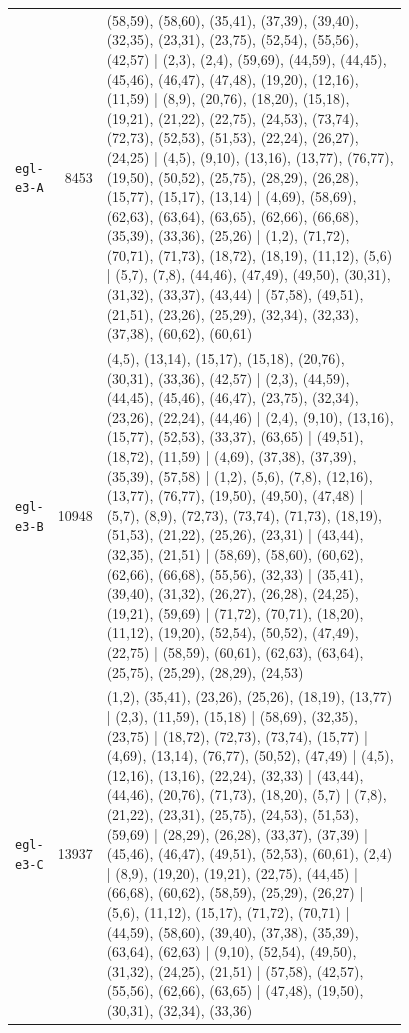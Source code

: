 \begin{landscape}
\begin{longtable}{lr>{\tiny\raggedright\arraybackslash}p{0.78\linewidth}}
\texttt{egl-e3-A} & 8453 & (58,59), (58,60), (35,41), (37,39), (39,40), (32,35), (23,31), (23,75), (52,54), (55,56), (42,57) | (2,3), (2,4), (59,69), (44,59), (44,45), (45,46), (46,47), (47,48), (19,20), (12,16), (11,59) | (8,9), (20,76), (18,20), (15,18), (19,21), (21,22), (22,75), (24,53), (73,74), (72,73), (52,53), (51,53), (22,24), (26,27), (24,25) | (4,5), (9,10), (13,16), (13,77), (76,77), (19,50), (50,52), (25,75), (28,29), (26,28), (15,77), (15,17), (13,14) | (4,69), (58,69), (62,63), (63,64), (63,65), (62,66), (66,68), (35,39), (33,36), (25,26) | (1,2), (71,72), (70,71), (71,73), (18,72), (18,19), (11,12), (5,6) | (5,7), (7,8), (44,46), (47,49), (49,50), (30,31), (31,32), (33,37), (43,44) | (57,58), (49,51), (21,51), (23,26), (25,29), (32,34), (32,33), (37,38), (60,62), (60,61) \\[2pt]
\texttt{egl-e3-B} & 10948 & (4,5), (13,14), (15,17), (15,18), (20,76), (30,31), (33,36), (42,57) | (2,3), (44,59), (44,45), (45,46), (46,47), (23,75), (32,34), (23,26), (22,24), (44,46) | (2,4), (9,10), (13,16), (15,77), (52,53), (33,37), (63,65) | (49,51), (18,72), (11,59) | (4,69), (37,38), (37,39), (35,39), (57,58) | (1,2), (5,6), (7,8), (12,16), (13,77), (76,77), (19,50), (49,50), (47,48) | (5,7), (8,9), (72,73), (73,74), (71,73), (18,19), (51,53), (21,22), (25,26), (23,31) | (43,44), (32,35), (21,51) | (58,69), (58,60), (60,62), (62,66), (66,68), (55,56), (32,33) | (35,41), (39,40), (31,32), (26,27), (26,28), (24,25), (19,21), (59,69) | (71,72), (70,71), (18,20), (11,12), (19,20), (52,54), (50,52), (47,49), (22,75) | (58,59), (60,61), (62,63), (63,64), (25,75), (25,29), (28,29), (24,53) \\[2pt]
\texttt{egl-e3-C} & 13937 & (1,2), (35,41), (23,26), (25,26), (18,19), (13,77) | (2,3), (11,59), (15,18) | (58,69), (32,35), (23,75) | (18,72), (72,73), (73,74), (15,77) | (4,69), (13,14), (76,77), (50,52), (47,49) | (4,5), (12,16), (13,16), (22,24), (32,33) | (43,44), (44,46), (20,76), (71,73), (18,20), (5,7) | (7,8), (21,22), (23,31), (25,75), (24,53), (51,53), (59,69) | (28,29), (26,28), (33,37), (37,39) | (45,46), (46,47), (49,51), (52,53), (60,61), (2,4) | (8,9), (19,20), (19,21), (22,75), (44,45) | (66,68), (60,62), (58,59), (25,29), (26,27) | (5,6), (11,12), (15,17), (71,72), (70,71) | (44,59), (58,60), (39,40), (37,38), (35,39), (63,64), (62,63) | (9,10), (52,54), (49,50), (31,32), (24,25), (21,51) | (57,58), (42,57), (55,56), (62,66), (63,65) | (47,48), (19,50), (30,31), (32,34), (33,36) \\[2pt]

\end{longtable}
\end{landscape}
